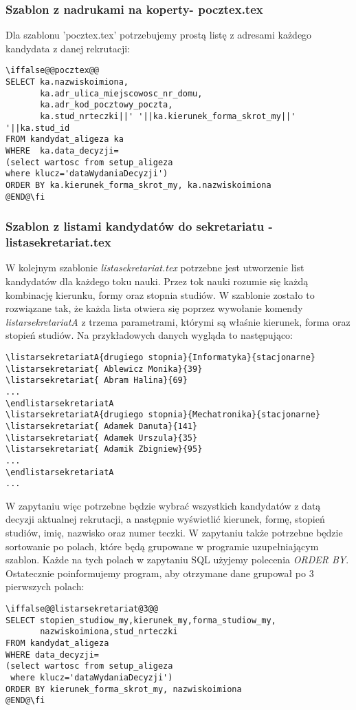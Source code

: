 \subsubsection*{Szablon z nadrukami na koperty- pocztex.tex}
Dla szablonu 'pocztex.tex' potrzebujemy prostą listę z adresami każdego kandydata z danej rekrutacji:


 \begin{lstlisting}
\iffalse@@pocztex@@
SELECT ka.nazwiskoimiona,
       ka.adr_ulica_miejscowosc_nr_domu,
	   ka.adr_kod_pocztowy_poczta,
	   ka.stud_nrteczki||' '||ka.kierunek_forma_skrot_my||' '||ka.stud_id	   
FROM kandydat_aligeza ka 
WHERE  ka.data_decyzji=
(select wartosc from setup_aligeza 
where klucz='dataWydaniaDecyzji')
ORDER BY ka.kierunek_forma_skrot_my, ka.nazwiskoimiona
@END@\fi
\end{lstlisting}

\subsubsection*{Szablon z listami kandydatów do sekretariatu - listasekretariat.tex}
W kolejnym szablonie \emph{listasekretariat.tex} potrzebne jest utworzenie list kandydatów dla każdego toku nauki. Przez tok nauki rozumie się każdą kombinację kierunku, formy oraz stopnia studiów. W szablonie zostało to rozwiązane tak, że każda lista otwiera się poprzez wywołanie komendy \emph{listarsekretariatA} z trzema parametrami, którymi są właśnie kierunek, forma oraz stopień studiów. Na przykładowych danych wygląda to następująco:
 \begin{lstlisting}
\listarsekretariatA{drugiego stopnia}{Informatyka}{stacjonarne}
\listarsekretariat{ Ablewicz Monika}{39}
\listarsekretariat{ Abram Halina}{69}
...
\endlistarsekretariatA
\listarsekretariatA{drugiego stopnia}{Mechatronika}{stacjonarne}
\listarsekretariat{ Adamek Danuta}{141}
\listarsekretariat{ Adamek Urszula}{35}
\listarsekretariat{ Adamik Zbigniew}{95}
...
\endlistarsekretariatA
...
\end{lstlisting}

W zapytaniu więc potrzebne będzie wybrać wszystkich kandydatów z datą decyzji aktualnej rekrutacji, a następnie wyświetlić kierunek, formę, stopień studiów, imię, nazwisko oraz numer teczki. W zapytaniu także potrzebne będzie sortowanie po polach, które będą grupowane w programie uzupełniającym szablon. Każde na tych polach w zapytaniu SQL użyjemy polecenia \emph{ORDER BY}. Ostatecznie poinformujemy program, aby otrzymane dane grupował po 3 pierwszych polach:
 \begin{lstlisting}
\iffalse@@listarsekretariat@3@@
SELECT stopien_studiow_my,kierunek_my,forma_studiow_my,
       nazwiskoimiona,stud_nrteczki
FROM kandydat_aligeza
WHERE data_decyzji=
(select wartosc from setup_aligeza
 where klucz='dataWydaniaDecyzji')
ORDER BY kierunek_forma_skrot_my, nazwiskoimiona
@END@\fi
\end{lstlisting}

